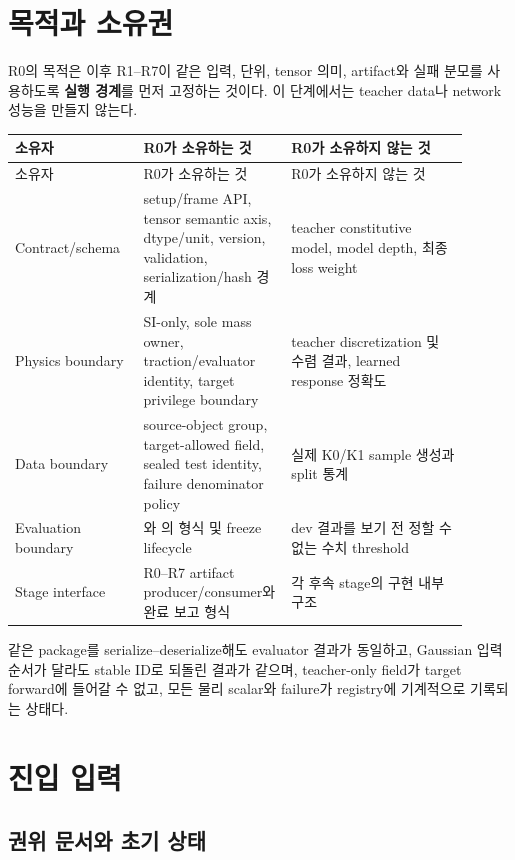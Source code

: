 \documentclass[10pt]{article}
\begin{document}
\tableofcontents
\newpage

\section{목적과 소유권}
\label{sec:r0-chapter-1}

R0의 목적은 이후 R1--R7이 같은 입력, 단위, tensor 의미, artifact와 실패 분모를 사용하도록
\textbf{실행 경계}를 먼저 고정하는 것이다. 이 단계에서는 teacher data나 network 성능을 만들지 않는다.

\begin{longtable}{L{0.24\linewidth}L{0.30\linewidth}L{0.36\linewidth}}
\toprule
소유자 & R0가 소유하는 것 & R0가 소유하지 않는 것\\
\midrule
\endfirsthead
\toprule
소유자 & R0가 소유하는 것 & R0가 소유하지 않는 것\\
\midrule
\endhead
Contract/schema & setup/frame API, tensor semantic axis, dtype/unit, version, validation, serialization/hash 경계 & teacher constitutive model, model depth, 최종 loss weight\\
Physics boundary & SI-only, sole mass owner, traction/evaluator identity, target privilege boundary & teacher discretization 및 수렴 결과, learned response 정확도\\
Data boundary & source-object group, target-allowed field, sealed test identity, failure denominator policy & 실제 K0/K1 sample 생성과 split 통계\\
Evaluation boundary & 와 의 형식 및 freeze lifecycle & dev 결과를 보기 전 정할 수 없는 수치 threshold\\
Stage interface & R0--R7 artifact producer/consumer와 완료 보고 형식 & 각 후속 stage의 구현 내부 구조\\
\bottomrule
\end{longtable}

 같은 package를 serialize--deserialize해도 evaluator 결과가 동일하고,
Gaussian 입력 순서가 달라도 stable ID로 되돌린 결과가 같으며, teacher-only field가 target forward에
들어갈 수 없고, 모든 물리 scalar와 failure가 registry에 기계적으로 기록되는 상태다.

\section{진입 입력}
\label{sec:r0-chapter-2}

\subsection{권위 문서와 초기 상태}
\end{document}
